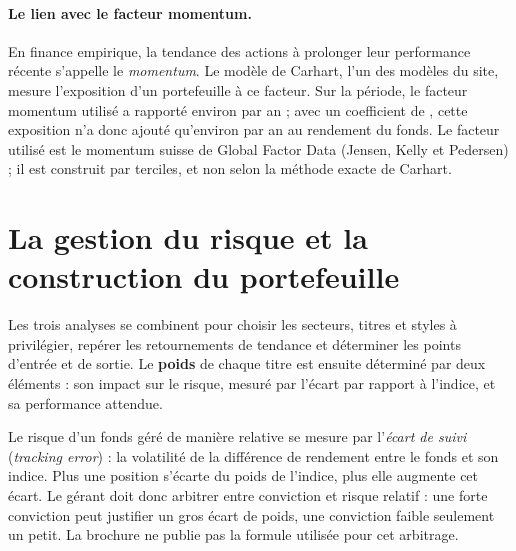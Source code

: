\documentclass[11pt,a4paper]{article}
\begin{document}
\paragraph{Le lien avec le facteur momentum.} En finance empirique, la tendance des actions à prolonger leur performance récente s'appelle le \emph{momentum}. Le modèle de Carhart, l'un des modèles du site, mesure l'exposition d'un portefeuille à ce facteur. \MomPhrase{} Sur la période, le facteur momentum utilisé a rapporté environ \CarMomPrime{} par an ; avec un coefficient de \CarMom{}, cette exposition n'a donc ajouté qu'environ \CarMomContrib{} par an au rendement du fonds. Le facteur utilisé est le momentum suisse de Global Factor Data (Jensen, Kelly et Pedersen) ; il est construit par terciles, et non selon la méthode exacte de Carhart.

\section{La gestion du risque et la construction du portefeuille}

Les trois analyses se combinent pour choisir les secteurs, titres et styles à privilégier, repérer les retournements de tendance et déterminer les points d'entrée et de sortie. Le \textbf{poids} de chaque titre est ensuite déterminé par deux éléments : son impact sur le risque, mesuré par l'écart par rapport à l'indice, et sa performance attendue.

Le risque d'un fonds géré de manière relative se mesure par l'\emph{écart de suivi} (\emph{tracking error}) : la volatilité de la différence de rendement entre le fonds et son indice. Plus une position s'écarte du poids de l'indice, plus elle augmente cet écart. Le gérant doit donc arbitrer entre conviction et risque relatif : une forte conviction peut justifier un gros écart de poids, une conviction faible seulement un petit. La brochure ne publie pas la formule utilisée pour cet arbitrage.
\end{document}
